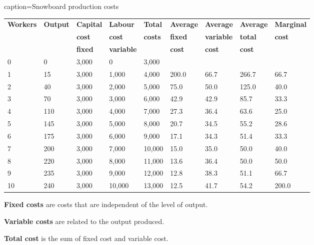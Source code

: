\begin{Table}{caption={Snowboard production costs \label{table:snowprodcost}}}
	\begin{tabu} to \linewidth {|X[1,c]X[0.9,c]X[1,c]X[1,c]X[0.9,c]X[1,c]X[1,c]X[1,c]X[1.1,c]|} \hline 
			\textbf{Workers} & \textbf{Output} & \textbf{Capital} & \textbf{Labour} & \textbf{Total} & \textbf{Average} & \textbf{Average} & \textbf{Average} & \textbf{Marginal} \\[-0.1em]
			&	&	\textbf{cost}	&	\textbf{cost}	&	\textbf{costs}	&	\textbf{fixed}	&	\textbf{variable}	&	\textbf{total}	&	\textbf{cost}	\\[-0.1em]
			&	&	\textbf{fixed}	&	\textbf{variable}	&	&	\textbf{cost}	&	\textbf{cost}	&	\textbf{cost}	&	\\	 & 0 & 3,000 & 0 & 3,000 &  &  &  &  \\
			1 & 15 & 3,000 & 1,000 & 4,000 & 200.0 & 66.7 & 266.7 & 66.7 \\
		2 & 40 & 3,000 & 2,000 & 5,000 & 75.0 & 50.0 & 125.0 & 40.0 \\ 
			3 & 70 & 3,000 & 3,000 & 6,000 & 42.9 & 42.9 & 85.7 & 33.3 \\ 
		4 & 110 & 3,000 & 4,000 & 7,000 & 27.3 & 36.4 & 63.6 & 25.0 \\ 
			5 & 145 & 3,000 & 5,000 & 8,000 & 20.7 & 34.5 & 55.2 & 28.6 \\
		6 & 175 & 3,000 & 6,000 & 9,000 & 17.1 & 34.3 & 51.4 & 33.3 \\ 
			7 & 200 & 3,000 & 7,000 & 10,000 & 15.0 & 35.0 & 50.0 & 40.0 \\
		8 & 220 & 3,000 & 8,000 & 11,000 & 13.6 & 36.4 & 50.0 & 50.0 \\
			9 & 235 & 3,000 & 9,000 & 12,000 & 12.8 & 38.3 & 51.1 & 66.7 \\ 
		10 & 240 & 3,000 & 10,000 & 13,000 & 12.5 & 41.7 & 54.2 & 200.0 \\ \hline 
	\end{tabu}
\end{Table}

\newhtmlpage

\begin{DefBox}
	\textbf{Fixed costs} are costs that are independent of the level of output.
	
	\textbf{Variable costs} are related to the output produced.
	
	\textbf{Total cost} is the sum of fixed cost and variable cost.
\end{DefBox}

